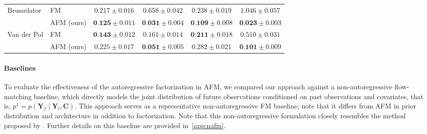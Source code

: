 \documentclass[preprint,12pt,authoryear]{elsarticle}
\newcommand{\oldrev}[1]{#1}
\begin{document}
\begin{table}[!ht]
\begin{adjustbox}{max width=\textwidth}
\begin{tabular}{l l cc cc}
        \midrule
        \multirow{2}{*}{Brusselator} 
            & FM  & $0.217 \pm 0.016$ & $0.658 \pm 0.042$ & $0.238 \pm 0.019$ & $1.046 \pm 0.057$ \\
            & AFM \oldrev{(ours)} & $\textbf{0.125} \pm 0.011$ & $\textbf{0.031} \pm 0.004$ & $\textbf{0.109} \pm 0.008$ & $\textbf{0.023} \pm 0.003$ \\
        \midrule
        \multirow{2}{*}{Van der Pol} 
            & FM  & $\textbf{0.143} \pm 0.012$ & $0.161 \pm 0.014$ & $\textbf{0.211} \pm 0.018$ & $0.510 \pm 0.031$ \\
            & AFM \oldrev{(ours)} & $0.225 \pm 0.017$ & $\textbf{0.051} \pm 0.005$ & $0.282 \pm 0.021$ & $\textbf{0.101} \pm 0.009$ \\
        \bottomrule
    \end{tabular}
    \end{adjustbox}
    \label{table:dynamical_systems}
\end{table}

\paragraph{Baselines} To evaluate the effectiveness of the autoregressive factorization in AFM, we compared our approach against a non-autoregressive flow-matching baseline, which directly models the joint distribution of future observations conditioned on past observations and covariates, that is,  ${p^1 =p(\mathbf{Y}_f \mid \mathbf{Y}_l, \mathbf{C})}$. 
\oldrev{This approach serves as a representative non-autoregressive FM baseline; note that it differs from AFM in prior distribution and architecture in addition to factorization.} Note that this non-autoregressive formulation closely resembles the method proposed by \citet{Kerrigan2024Flow}. Further details on this baseline are provided in~\ref{app:nafm}.
\end{document}
